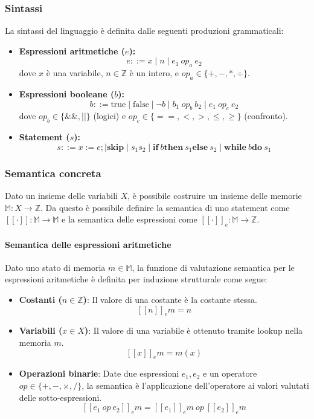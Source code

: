 \subsubsection{Sintassi}
La sintassi del linguaggio è definita dalle seguenti produzioni
grammaticali:
\begin{itemize}
    \item \textbf{Espressioni aritmetiche ($e$):}
    \[ e ::= x \mid n \mid e_1 \ op_a \ e_2 \]
    dove $x$ è una variabile, $n \in \mathbb{Z}$ è un intero, e $op_a \in \{+, -, *, \div\}$.

    \item \textbf{Espressioni booleane ($b$):}
    \[ b ::= \text{true} \mid \text{false} \mid \neg b \mid b_1 \ op_b \ b_2 \mid e_1 \ op_c \ e_2 \]
    dove $op_b \in \{\&\&, ||\}$ (logici) e $op_c \in \{==, <, >, \le, \ge\}$ (confronto).

    \item \textbf{Statement ($s$):}
    \[ s ::= x := e ; \mid \textbf{skip} \mid s_1 s_2 \mid \textbf{if}\ b \textbf{then}\ s_1 \textbf{else}\ s_2 \mid \textbf{while}\ b \textbf{do}\ s_1 \]
\end{itemize}

\subsubsection{Semantica concreta}
Dato un insieme delle variabili $X$, è possibile costruire un insieme delle
memorie $\mathbb{M} : X \to \mathbb{Z}$.
Da questo è possibile definire la semantica di uno statement come
$[\![ \cdot ]\!] : \mathbb{M} \to \mathbb{M}$ e la semantica delle espressioni come
$[\![ \cdot ]\!]_e : \mathbb{M} \to \mathbb{Z}$.

\paragraph{Semantica delle espressioni aritmetiche}
Dato uno stato di memoria $m \in \mathbb{M}$, la funzione di valutazione semantica per le espressioni aritmetiche è definita per induzione strutturale come segue:

\begin{itemize}
    \item \textbf{Costanti ($n \in \mathbb{Z}$)}: Il valore di una costante è la costante stessa.
    \[ [\![ n ]\!]_e m = n \]
    
    \item \textbf{Variabili ($x \in X$)}: Il valore di una variabile è ottenuto tramite lookup nella memoria $m$.
    \[ [\![ x ]\!]_e m = m(x) \]
    
    \item \textbf{Operazioni binarie}: Date due espressioni $e_1, e_2$ e un operatore $op \in \{+, -, \times, /\}$, la semantica è l'applicazione dell'operatore ai valori valutati delle sotto-espressioni.
    \[ [\![ e_1 \ op \ e_2 ]\!]_e m = [\![ e_1 ]\!]_e m \ op \ [\![ e_2 ]\!]_e m \]
\end{itemize}

